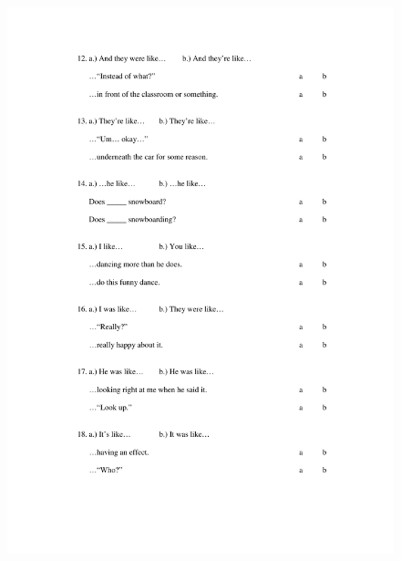 \begin{figure}[htbp]
	\centering
		\includegraphics[width=5in]{images/Exp1page3.pdf}
		\label{x1p3}
\end{figure}


